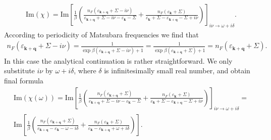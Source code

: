 \documentclass[preprint,prb,amsmath,superscriptaddress,showpacs]{revtex4}
\begin{document}
\begin{align}
       \mathrm{Im} (\chi) = \mathrm{Im}\left[ \frac{1}{\beta} \left( \frac{n_F(\varepsilon_{\mathbf{k}+\mathbf{q}} + \Sigma - i\nu)}{\varepsilon_{\mathbf{k} + \mathbf{q}} + \Sigma - i \nu - \varepsilon_{\mathbf{k}} - \Sigma} + \frac{n_F(\varepsilon_{\mathbf{k}} + \Sigma)}{\varepsilon_{\mathbf{k}} + \Sigma - \varepsilon_{\mathbf{k}+\mathbf{q}} - \Sigma + i\nu}\right) \right]_{i\nu \rightarrow \omega + i\delta}.
\end{align}
According to periodicity of Matsubara frequencies we find that
\begin{align*}
    n_F(\varepsilon_{\mathbf{k}+\mathbf{q}} + \Sigma - i\nu) = \frac{1}{\exp{\beta (\varepsilon_{\mathbf{k}+\mathbf{q}} + \Sigma - i\nu)} + 1} = \frac{1}{\exp{\beta (\varepsilon_{\mathbf{k}+\mathbf{q}} + \Sigma)} + 1} = n_F(\varepsilon_{\mathbf{k}+\mathbf{q}} + \Sigma).
\end{align*}
In this case the analytical continuation is rather straightforward. We only substitute $i\nu$ by $ \omega + i\delta$, where $\delta$ is infinitesimally small real number, and obtain final formula 
\begin{equation}
    \begin{gathered}
    \mathrm{Im} (\chi(\omega)) = \mathrm{Im}\left[ \frac{1}{\beta} \left( \frac{n_F(\varepsilon_{\mathbf{k}+\mathbf{q}} + \Sigma)}{\varepsilon_{\mathbf{k} + \mathbf{q}} + \Sigma - i\nu - \varepsilon_{\mathbf{k}} - \Sigma} + \frac{n_F(\varepsilon_{\mathbf{k}} + \Sigma)}{\varepsilon_{\mathbf{k}} + \Sigma - \varepsilon_{\mathbf{k}+\mathbf{q}} - \Sigma + i\nu} \right) \right]_{i\nu \rightarrow \omega + i\delta} = \\
    \mathrm{Im}\left[ \frac{1}{\beta} \left( \frac{n_F(\varepsilon_{\mathbf{k}+\mathbf{q}} + \Sigma)}{\varepsilon_{\mathbf{k} + \mathbf{q}} - \varepsilon_{\mathbf{k}} - \omega - i\delta} + \frac{n_F(\varepsilon_{\mathbf{k}} + \Sigma)}{\varepsilon_{\mathbf{k}} - \varepsilon_{\mathbf{k}+\mathbf{q}} + \omega + i\delta} \right) \right].
    \end{gathered}
\end{equation}
\end{document}
